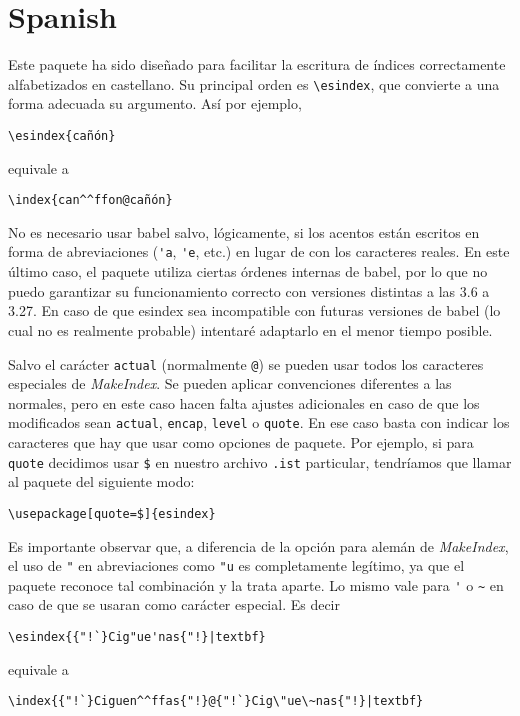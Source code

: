 \documentclass[a4paper]{ltxguide}
\begin{document}
\section{Spanish}

Este paquete ha sido diseñado para facilitar la escritura de índices
correctamente alfabetizados en castellano. Su principal orden es
\verb|\esindex|, que convierte a una forma adecuada su argumento. Así
por ejemplo,
\begin{verbatim}
\esindex{cañón}
\end{verbatim}
equivale a
\begin{verbatim}
\index{can^^ffon@cañón}
\end{verbatim}
No es necesario usar \textsf{babel} salvo, lógicamente, si los acentos
están escritos en forma de abreviaciones (\verb|'a|, \verb|'e|, etc.)
en lugar de con los caracteres reales. En este último caso, el paquete
utiliza ciertas órdenes internas de \textsf{babel}, por lo que no puedo
garantizar su funcionamiento correcto con versiones distintas a las 3.6
a 3.27. En caso de que \textsf{esindex} sea incompatible con futuras
versiones de \textsf{babel} (lo cual no es realmente probable)
intentaré adaptarlo en el menor tiempo posible.

Salvo el carácter \verb|actual| (normalmente \verb|@|) se pueden usar
todos los caracteres especiales de \textit{MakeIndex}. Se pueden
aplicar convenciones diferentes a las normales, pero en este caso hacen
falta ajustes adicionales en caso de que los modificados sean
\verb|actual|, \verb|encap|, \verb|level| o \verb|quote|. En ese caso
basta con indicar los caracteres que hay que usar como opciones de
paquete. Por ejemplo, si para \verb|quote| decidimos usar \verb|$| en
nuestro archivo \verb|.ist| particular, tendríamos que llamar al
paquete del siguiente modo:
\begin{verbatim}
\usepackage[quote=$]{esindex}
\end{verbatim}

Es importante observar que, a diferencia de la opción para alemán de
\textit{MakeIndex}, el uso de \verb|"| en abreviaciones como \verb|"u|
es completamente legítimo, ya que el paquete reconoce tal combinación y
la trata aparte. Lo mismo vale para \verb|'| o \verb|~| en caso de que
se usaran como carácter especial. Es decir
\begin{verbatim}
\esindex{{"!`}Cig"ue'nas{"!}|textbf}
\end{verbatim}
equivale a
\begin{verbatim}
\index{{"!`}Ciguen^^ffas{"!}@{"!`}Cig\"ue\~nas{"!}|textbf}
\end{verbatim}
\end{document}
